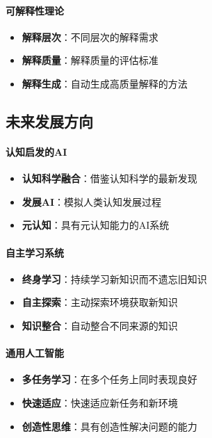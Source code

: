 \paragraph{可解释性理论}
\begin{itemize}
\item \textbf{解释层次}：不同层次的解释需求
\item \textbf{解释质量}：解释质量的评估标准
\item \textbf{解释生成}：自动生成高质量解释的方法
\end{itemize}

\subsection{未来发展方向}

\paragraph{认知启发的AI}
\begin{itemize}
\item \textbf{认知科学融合}：借鉴认知科学的最新发现
\item \textbf{发展AI}：模拟人类认知发展过程
\item \textbf{元认知}：具有元认知能力的AI系统
\end{itemize}

\paragraph{自主学习系统}
\begin{itemize}
\item \textbf{终身学习}：持续学习新知识而不遗忘旧知识
\item \textbf{自主探索}：主动探索环境获取新知识
\item \textbf{知识整合}：自动整合不同来源的知识
\end{itemize}

\paragraph{通用人工智能}
\begin{itemize}
\item \textbf{多任务学习}：在多个任务上同时表现良好
\item \textbf{快速适应}：快速适应新任务和新环境
\item \textbf{创造性思维}：具有创造性解决问题的能力
\end{itemize}

